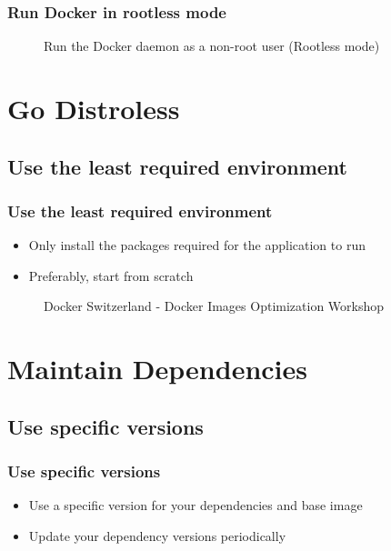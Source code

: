 \documentclass[10pt, compress]{beamer}
\begin{document}
\begin{frame}[fragile]
  \frametitle{Run Docker in rootless mode}
  
  \begin{figure}
      \centering
      \caption{Run the Docker daemon as a non-root user (Rootless mode)}
  \end{figure}
\end{frame}

\section{Go Distroless}

\subsection{Use the least required environment}

\begin{frame}[fragile]
  \frametitle{Use the least required environment}
  
  \begin{itemize}
      \item Only install the packages required for the application to run
      \item Preferably, start from scratch
  \end{itemize}
  
  \begin{figure}
      \centering
      \caption{Docker Switzerland - Docker Images Optimization Workshop}
  \end{figure}
\end{frame}

\section{Maintain Dependencies}

\subsection{Use specific versions}

\begin{frame}[fragile]
  \frametitle{Use specific versions}
  
  \begin{itemize}
      \item Use a specific version for your dependencies and base image
      \item Update your dependency versions periodically
  \end{itemize}
\end{frame}
\end{document}
